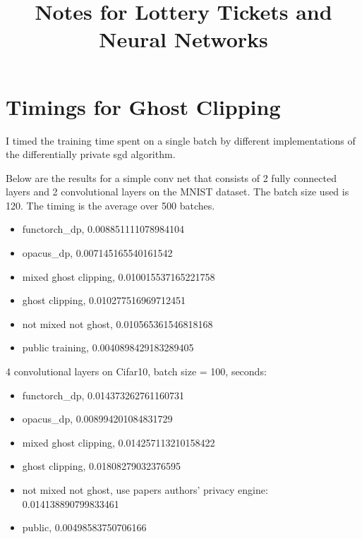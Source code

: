 \documentclass{article}
\date{}
\author{}
\title{Notes for Lottery Tickets and Neural Networks}
\theoremstyle{plain}
\begin{document}
\maketitle
    
\doublespacing
\section*{Timings for Ghost Clipping}
I timed the training time spent on a single batch by different implementations of the differentially private sgd algorithm.

Below are the results for a simple conv net that consists of 2 fully connected layers and 2 convolutional layers on the MNIST dataset. The batch size used is 120. The timing is the average over 500 batches.
\begin{itemize}
    \item functorch\_dp, 0.008851111078984104
    \item opacus\_dp, 0.007145165540161542
    \item mixed ghost clipping, 0.010015537165221758
    \item ghost clipping, 0.010277516969712451
    \item not mixed not ghost, 0.010565361546818168
    \item public training, 0.0040898429183289405
\end{itemize}

4 convolutional layers on Cifar10, batch size = 100, seconds:
\begin{itemize}
    \item functorch\_dp, 0.014373262761160731
    \item opacus\_dp, 0.008994201084831729
    \item mixed ghost clipping, 0.014257113210158422
    \item ghost clipping, 0.01808279032376595
    \item not mixed not ghost, use papers authors' privacy engine:  0.014138890799833461
    \item public, 0.00498583750706166
\end{itemize}
\end{document}
